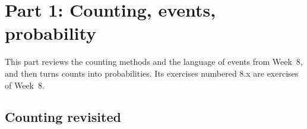 
\maketitle

\tableofcontents
\clearpage

\section{Part 1: Counting, events, probability}

This part reviews the counting methods and the language of events from
Week~8, and then turns counts into probabilities. Its exercises numbered 8.x
are exercises of Week~8.

\subsection*{Counting revisited}

